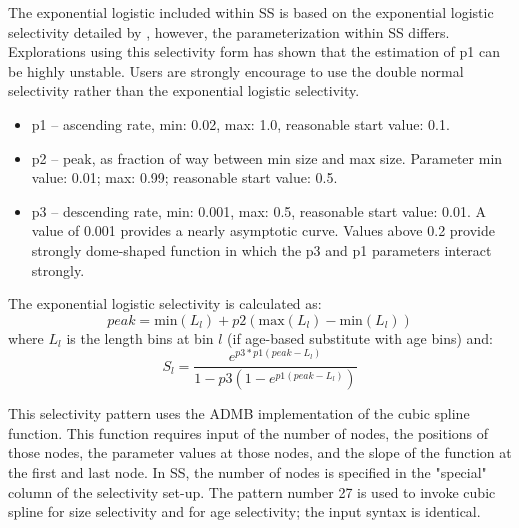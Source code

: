 The exponential logistic included within SS is based on the exponential logistic selectivity detailed by \citet{thompson_confounding_1994}, however, the parameterization within SS differs.  Explorations using this selectivity form has shown that the estimation of p1 can be highly unstable.  Users are strongly encourage to use the double normal selectivity rather than the exponential logistic selectivity.
	\begin{itemize}
		\item p1 – ascending rate, min: 0.02, max: 1.0, reasonable start value: 0.1.
		\item p2 – peak, as fraction of way between min size and max size.  Parameter min value:  0.01; max:  0.99; reasonable start value: 0.5.
		\item p3 – descending rate, min: 0.001, max: 0.5, reasonable start value:  0.01.  A value of 0.001 provides a nearly asymptotic curve. Values above 0.2 provide strongly dome-shaped function in which the p3 and p1 parameters interact strongly.
	\end{itemize}

The exponential logistic selectivity is calculated as:
	\begin{equation}
	peak = \text{min}(L_l) + p2(\text{max}(L_l) - \text{min}(L_l) )
	\end{equation}
where $L_l$ is the length bins at bin $l$ (if age-based substitute with age bins) and:
	\begin{equation}
	S_l = \frac{e^{p3*p1(peak-L_l)}}{1-p3(1-e^{p1(peak- L_l)})}
	\end{equation}


This selectivity pattern uses the ADMB implementation of the cubic spline function. This function requires input of the number of nodes, the positions of those nodes, the parameter values at those nodes, and the slope of the function at the first and last node. In SS, the number of nodes is specified in the "special" column of the selectivity set-up.  The pattern number 27 is used to invoke cubic spline for size selectivity and for age selectivity; the input syntax is identical.
	

